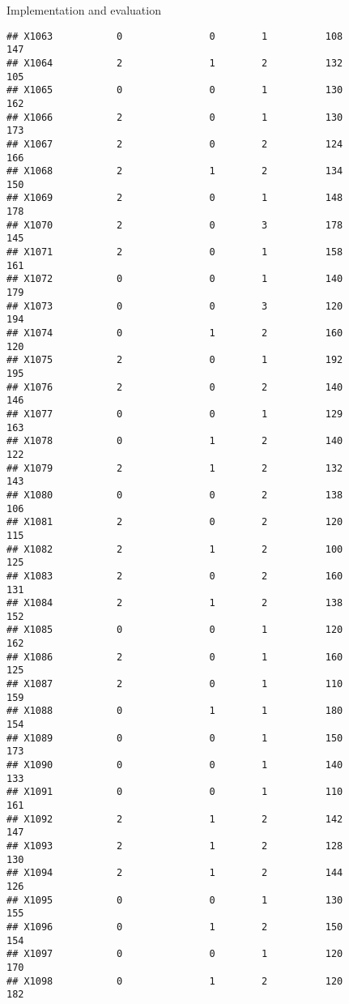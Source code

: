 \documentclass[
  ignorenonframetext,
]{beamer}
\begin{document}
\begin{frame}[fragile]{Implementation and evaluation}
\begin{verbatim}
## X1063           0               0        1          108            147
## X1064           2               1        2          132            105
## X1065           0               0        1          130            162
## X1066           2               0        1          130            173
## X1067           2               0        2          124            166
## X1068           2               1        2          134            150
## X1069           2               0        1          148            178
## X1070           2               0        3          178            145
## X1071           2               0        1          158            161
## X1072           0               0        1          140            179
## X1073           0               0        3          120            194
## X1074           0               1        2          160            120
## X1075           2               0        1          192            195
## X1076           2               0        2          140            146
## X1077           0               0        1          129            163
## X1078           0               1        2          140            122
## X1079           2               1        2          132            143
## X1080           0               0        2          138            106
## X1081           2               0        2          120            115
## X1082           2               1        2          100            125
## X1083           2               0        2          160            131
## X1084           2               1        2          138            152
## X1085           0               0        1          120            162
## X1086           2               0        1          160            125
## X1087           2               0        1          110            159
## X1088           0               1        1          180            154
## X1089           0               0        1          150            173
## X1090           0               0        1          140            133
## X1091           0               0        1          110            161
## X1092           2               1        2          142            147
## X1093           2               1        2          128            130
## X1094           2               1        2          144            126
## X1095           0               0        1          130            155
## X1096           0               1        2          150            154
## X1097           0               0        1          120            170
## X1098           0               1        2          120            182

\end{verbatim}
\end{frame}
\end{document}

